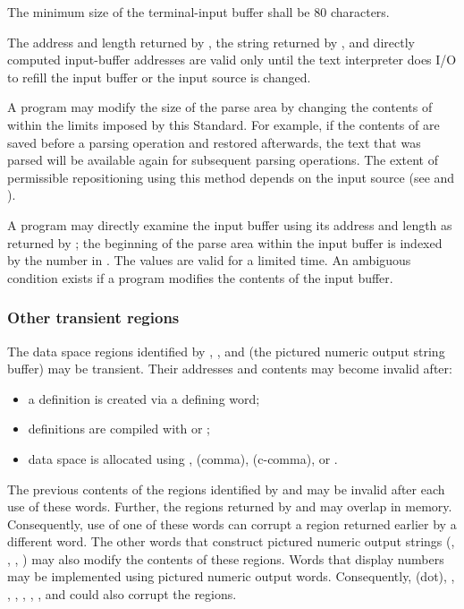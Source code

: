 The minimum size of the terminal-input buffer shall be 80
characters.

The address and length returned by , the string
returned by , and directly computed input-buffer
addresses are valid only until the text interpreter does I/O to
refill the input buffer or the input source is changed.

A program may modify the size of the parse area by changing the
contents of  within the limits imposed by this Standard.
For example, if the contents of  are saved before a
parsing operation and restored afterwards, the text that was parsed
will be available again for subsequent parsing operations. The
extent of permissible repositioning using this method depends on the
input source (see 
and ).

A program may directly examine the input buffer using its address
and length as returned by ; the beginning of the parse
area within the input buffer is indexed by the number in .
The values are valid for a limited time. An ambiguous condition
exists if a program modifies the contents of the input buffer.

\subsubsection{Other transient regions} %
\label{usage:transient}

The data space regions identified by , , and
 (the pictured numeric output string buffer) may be
transient. Their addresses and contents may become invalid after:

\begin{itemize}
\item a definition is created via a defining word;
\item definitions are compiled with \word{:} or ;
\item data space is allocated using , \word{,} (comma),
	 (c-comma), or .
\end{itemize}

The previous contents of the regions identified by  and
 may be invalid after each use of these words. Further,
the regions returned by  and  may overlap in
memory. Consequently, use of one of these words can corrupt a region
returned earlier by a different word. The other words that construct
pictured numeric output strings (, , ,
 )  may also modify the contents of these regions.
Words that display numbers may be implemented using pictured numeric
output words. Consequently,  (dot), ,
, , ,
, , and  could also corrupt
the regions.

